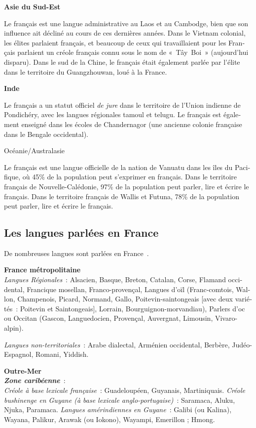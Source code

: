 \begin{french}
\begin{multicols}{2}
{\bf Asie du Sud-Est}

Le français est une langue administrative au
Laos et au Cambodge, bien que son influence ait décliné au cours de
ces dernières années. Dans le Vietnam colonial, les élites parlaient
français, et beaucoup de ceux qui travaillaient pour les Français
parlaient un créole français connu sous le nom de «~Tây~Boi~»
(aujourd'hui disparu).  Dans le sud de la Chine, le français
était également parlée par l'élite dans le territoire du
Guangzhouwan, loué à la France.

{\bf Inde}

Le français a un statut officiel {\em de jure} dans le territoire de l'Union indienne de Pondichéry, avec les langues régionales tamoul
et telugu. Le français est également enseigné dans les écoles de
Chandernagor (une ancienne colonie française dans le Bengale
occidental).

\begin{center}
{\sc Océanie/Australasie}
\end{center}

Le français est une langue officielle de la nation de Vanuatu dans les
îles du Pacifique, où 45\% de la population peut s'exprimer en
français. Dans le territoire français de Nouvelle-Calédonie, 97\% de
la population peut parler, lire et écrire le français. Dans le
territoire français de Wallis et Futuna, 78\% de la population peut
parler, lire et écrire le français.

\subsection{Les langues parlées en France}
\label{languagesSpokenInTheFrance}
De nombreuses langues sont parlées en France~\cite{francais}.

{\bf France métropolitaine}\\
{\em Langues Régionales}~: Alsacien, Basque, Breton, Catalan, Corse, Flamand occidental, Francique mosellan, Franco-provençal, Langues d'oïl (Franc-comtois, Wallon, Champenois, Picard, Normand, Gallo, Poitevin-saintongeais [avec deux variétés~: Poitevin et Saintongeais], Lorrain, Bourguignon-morvandiau), Parlers d'oc ou Occitan (Gascon, Languedocien, Provençal, Auvergnat, Limousin, Vivaro-alpin).

{\em Langues non-territoriales}~: Arabe dialectal, Arménien occidental, Berbère, Judéo-Espagnol, Romani, Yiddish.

{\bf Outre-Mer}\\
\textbf{ \emph{Zone caribéenne}}~:\\
{\em Créole à base lexicale française}~: Guadeloupéen, Guyanais, Martiniquais.
{\em Créole bushinenge en Guyane (à base lexicale anglo-portugaise)}~: Saramaca, Aluku, Njuka, Paramaca.
{\em Langues amérindiennes en Guyane}~: Galibi (ou Kalina), Wayana, Palikur, Arawak (ou Iokono), Wayampi, Emerillon ; Hmong.


\end{multicols}
\end{french}
